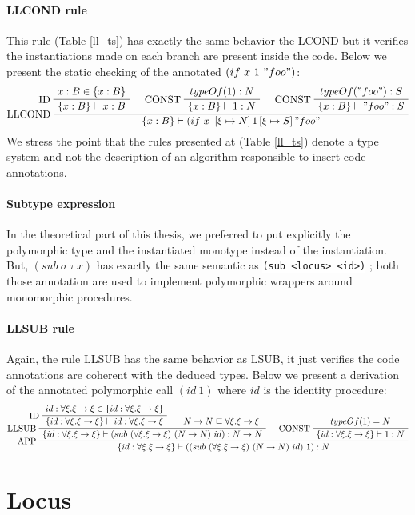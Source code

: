 \documentclass[a4paper]{report}
\newcommand{\ischeme}[1]{\colorbox{white}{\lstinline[language=scheme]&#1&}} %
\newcommand{\reftab}[1]{(Table \ref{#1})}
\newcommand{\ax}[1]%
{\AxiomC{$#1$}}
\newcommand{\unc}[1]%
{\UnaryInfC{$#1$}}
\newcommand{\bic}[1]%
{\BinaryInfC{$#1$}}
\newcommand{\tric}[1]%
{\TrinaryInfC{$#1$}}
\newcommand{\drule}%
{\DisplayProof}
\begin{document}
\paragraph{LLCOND rule} This rule \reftab{ll_ts} has exactly the same behavior the LCOND but it verifies the instantiations made on each branch are present inside the code. Below we present the static checking of the annotated $(if\ x\ 1\ "foo")$:
$$
\ax{x:B\in\{x:B\}}
\LeftLabel{ID}
\unc{\{x:B\}\vdash x:B}
\ax{typeOf(1):N}
\LeftLabel{CONST}
\unc{\{x:B\}\vdash 1:N}
\ax{typeOf("foo"):S}
\LeftLabel{CONST}
\unc{\{x:B\}\vdash "foo":S}
\LeftLabel{LLCOND}
\tric{\{x:B\}\vdash (if\ x\ \left[\xi\mapsto N\right] 1 \left[\xi\mapsto S\right] "foo"}
\drule
$$
We stress the point that the rules presented at \reftab{ll_ts} denote a type system and not the description of an algorithm responsible to insert code annotations.

\paragraph{Subtype expression} In the theoretical part of this thesis, we preferred to put explicitly the polymorphic type and the instantiated monotype instead of the instantiation. But, $(sub\ \sigma\ \tau\ x)$ has exactly the same semantic as \ischeme{(sub <locus> <id>)} ; both those annotation are used to implement polymorphic wrappers around monomorphic procedures.

\paragraph{LLSUB rule} Again, the rule LLSUB has the same behavior as LSUB, it just verifies the code annotations are coherent with the deduced types. Below we present a derivation of the annotated polymorphic call $(id\ 1)$ where $id$ is the identity procedure:
$$
\ax{id:\forall\xi.\xi\to\xi \in \{id:\forall\xi.\xi\to\xi\}}
\LeftLabel{ID}
\unc{\{id:\forall\xi.\xi\to\xi\}\vdash id:\forall\xi.\xi\to\xi}
\ax{N\to N \sqsubseteq \forall\xi.\xi\to\xi}
\LeftLabel{LLSUB}
\bic{\{id:\forall\xi.\xi\to\xi\}\vdash (sub\ (\forall\xi.\xi\to\xi)\ (N\to N)\ id):N\to N}
\ax{typeOf(1)=N}
\LeftLabel{CONST}
\unc{\{id:\forall\xi.\xi\to\xi\}\vdash 1:N}
\LeftLabel{APP}
\bic{\{id:\forall\xi.\xi\to\xi\}\vdash ((sub\ (\forall\xi.\xi\to\xi)\ (N\to N)\ id)\ 1):N}
\drule
$$

\section{Locus}
\end{document}
